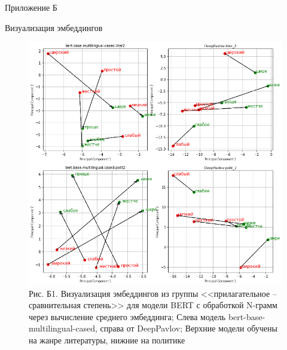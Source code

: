 \documentclass[a4paper,14pt]{article}
\begin{document}
\newpage


\begin{flushright}
	Приложение Б
\end{flushright}

\begin{center}
	Визуализация эмбеддингов
\end{center}


\begin{figure}[H]
	\centering
	\includegraphics[width=0.95\linewidth]{image/pril_2}
	\caption*{Рис. Б1. Визуализация эмбеддингов из группы <<прилагательное -- сравнительная степень>> для модели BERT с обработкой N-грамм через вычисление среднего эмбеддинга; Слева модель bert-base-multilingual-cased, справа от DeepPavlov; Верхние модели обучены на жанре литературы, нижние на политике}
	\label{fig:pril22}
\end{figure}
\end{document}
